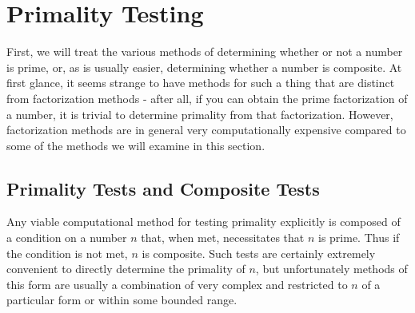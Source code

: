 \documentclass{article}
\begin{document}
\newpage



\section{ Primality Testing }

\par First, we will treat the various methods of determining whether or not a number is prime, or, as is usually easier, determining
whether a number is composite. At first glance, it seems strange to have methods for such a thing that are distinct from factorization methods - after all, if you can obtain the prime factorization of a number, it is trivial to determine primality from that factorization. However, factorization methods are in general very computationally expensive compared to some of the methods we will examine in this section. 


\subsection{ Primality Tests and Composite Tests }

\par Any viable computational method for testing primality explicitly is composed of a condition on a number $n$ that, when met, necessitates that $n$ is prime. Thus if the condition is not met, $n$ is composite. Such tests are certainly extremely convenient to directly determine the primality of $n$, but unfortunately methods of this form are usually a combination of very complex and restricted to $n$ of a particular form or within some bounded range.
\end{document}
